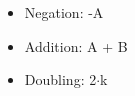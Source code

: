 \begin{itemize}
  \item Negation: -A
  \item Addition: A + B
  \item Doubling: 2$\cdot$k
\end{itemize}
